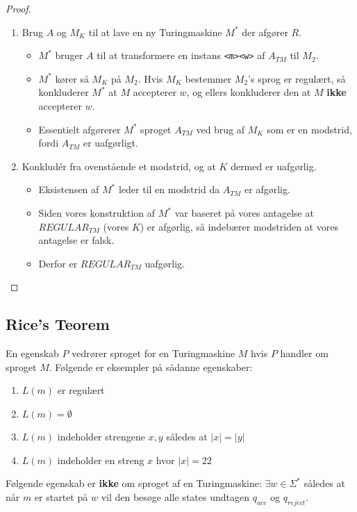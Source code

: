 \begin{proof}
\begin{enumerate}
		\item Brug $A$ og $M_{K}$ til at lave en ny Turingmaskine $M^{*}$ der afgører $R$.
		      \begin{itemize}
			      \item $M^{*}$ bruger $A$ til at transformere en instans \texttt{<m><w>} af $A_{TM}$ til $M_{2}$.
			      \item $M^{*}$ kører så $M_{K}$ på $M_{2}$. Hvis $M_{K}$ bestemmer $M_{2}$'s sprog er regulært, så konkluderer $M^{*}$ at $M$ accepterer $w$, og ellers konkluderer den at $M$ \textbf{ikke} accepterer $w$.
			      \item Essentielt afgørerer $M^{*}$ sproget $A_{TM}$ ved brug af $M_{K}$ som er en modstrid, fordi $A_{TM}$ er uafgørligt.
		      \end{itemize}
		\item Konkludér fra ovenstående et modstrid, og at $K$ dermed er uafgørlig.
		      \begin{itemize}
			      \item Eksistensen af $M^{*}$ leder til en modstrid da $A_{TM}$ er afgørlig.
			      \item Siden vores konstruktion af $M^{*}$ var baseret på vores antagelse at $REGULAR_{TM}$ (vores $K$) er afgørlig, så indebærer modstriden at vores antagelse er falsk.
			      \item Derfor er $REGULAR_{TM}$ uafgørlig.
		      \end{itemize}
	\end{enumerate}


\end{proof}

\subsection{Rice's Teorem}%
\label{subsec:ricetheorem}

En egenskab $P$ vedrører sproget for en Turingmaskine $M$ hvis $P$ handler om sproget $M$. Følgende er eksempler på sådanne egenskaber:
\begin{enumerate}
	\item $L(m)$ er regulært
	\item $L(m) = \emptyset$
	\item $L(m)$ indeholder strengene $x,y$ således at $|x| = |y|$
	\item $L(m)$ indeholder en streng $x$ hvor $|x| = 22$
\end{enumerate}
Følgende egenskab er \textbf{ikke} om sproget af en Turingmaskine: $\exists w \in \Sigma^{*}$ således at når $m$ er startet på $w$ vil den besøge alle states undtagen $q_{acc}$ og $q_{reject}$.

